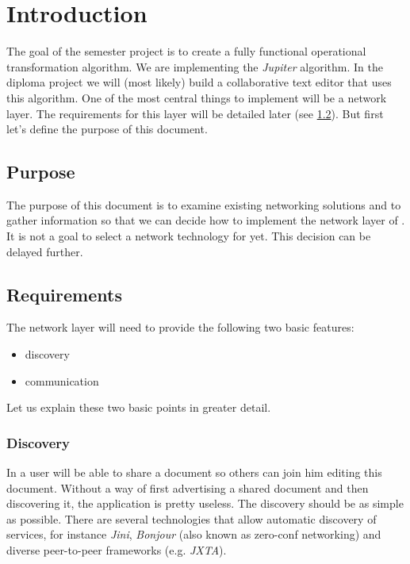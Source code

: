 \documentclass[11pt,a4paper]{article}
\begin{document}
\setlength{\parindent}{0pt}


\newpage

\tableofcontents
\newpage

\listoftables
\listoffigures
\newpage


\section{Introduction}
The goal of the semester project is to create a fully functional operational transformation algorithm. We are implementing the \emph{Jupiter} algorithm. In the diploma project we will (most likely) build a collaborative text editor that uses this algorithm. One of the most central things to implement will be a network layer. The requirements for this layer will be detailed later (see \ref{sect:requirements}). But first let's define the purpose of this document.

\subsection{Purpose}
The purpose of this document is to examine existing networking solutions and to gather information so that we can decide how to implement the network layer of \ace. It is not a goal to select a network technology for \ace yet. This decision can be delayed further. 

\subsection{Requirements}
\label{sect:requirements}
The network layer will need to provide the following two basic features:

\begin{itemize}
 \item discovery
 \item communication
\end{itemize}

Let us explain these two basic points in greater detail.

\subsubsection{Discovery}
In \ace a user will be able to share a document so others can join him editing this document. Without a way of first advertising a shared document and then discovering it, the application is pretty useless. The discovery should be as simple as possible. There are several technologies that allow automatic discovery of services, for instance \emph{Jini}, \emph{Bonjour} (also known as zero-conf networking) and diverse peer-to-peer frameworks (e.g. \emph{JXTA}).
\end{document}
